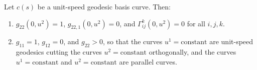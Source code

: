 Let $c(s)$ be a unit-speed geodesic basis curve. Then:
\begin{enumerate}
\item[(ii)] $g_{22}(0, u^2) = 1$, $g_{22,1}(0, u^2) = 0$, and $\Gamma_{ij}^k(0, u^2) = 0$ for all $i, j, k$.
\item[(iii)] $g_{11} = 1$, $g_{12} = 0$, and $g_{22} > 0$, so that the curves $u^1 = \text{constant}$ are unit-speed geodesics cutting the curves $u^2 = \text{constant}$ orthogonally, and the curves $u^1 = \text{constant}$ and $u^2 = \text{constant}$ are parallel curves.
\end{enumerate}

